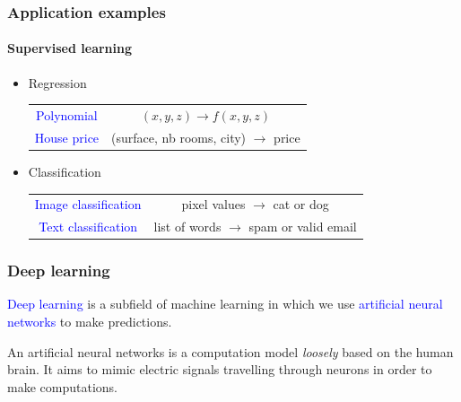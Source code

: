 \documentclass[9pt]{beamer}
\begin{document}
\begin{frame}

  \frametitle{Application examples}

  \framesubtitle{Supervised learning}

  \begin{itemize}
    \item Regression

      \smallskip

      \begin{center}
        \begin{tabular}{cc}
          \textcolor{blue}{Polynomial} & $(x, y, z) \to f(x, y, z)$ \\[0.5cm]
          \textcolor{blue}{House price} & (surface, nb rooms, city) $\to$ price \\[0.5cm]
        \end{tabular}
      \end{center}

    \item Classification

      \smallskip

      \begin{center}
        \begin{tabular}{cc}
          \textcolor{blue}{Image classification} & pixel values $\to$ cat or dog \\[0.5cm]
          \textcolor{blue}{Text classification} & list of words $\to$ spam or valid email
        \end{tabular}
      \end{center}
  \end{itemize}

\end{frame}

\begin{frame}

  \frametitle{Deep learning}

  \textcolor{blue}{Deep learning} is a subfield of machine learning in
  which we use \textcolor{blue}{artificial neural networks} to make
  predictions.

  \bigskip

  An artificial neural networks is a computation model \emph{loosely}
  based on the human brain. It aims to mimic electric signals
  travelling through neurons in order to make computations.

\end{frame}
\end{document}
